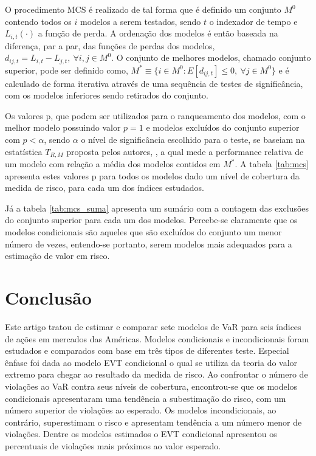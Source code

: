 \documentclass[1p]{elsarticle}
\theoremstyle{definition}
\begin{document}
O procedimento MCS é realizado de tal forma que é definido um conjunto $M^0$ contendo todos os $i$ modelos a serem testados, sendo $t$ o indexador de tempo e $L_{i, t}(\cdot)$ a função de perda. A ordenação dos modelos é então baseada na diferença, par a par, das funções de perdas dos modelos, $d_{ij, t} = L_{i, t}-L_{j, t}, \ \forall i,j \in M^0$. O conjunto de melhores modelos, chamado conjunto superior, pode ser definido como, $M^\ast \equiv \{i \in M^0 : E[d_{ij,t}] \leq 0, \ \forall j \in M^0\}$ e é calculado de forma iterativa através de uma sequência de testes de significância, com os modelos inferiores sendo retirados do conjunto.

Os valores p, que podem ser utilizados para o ranqueamento dos modelos, com o melhor modelo possuindo valor $p=1$ e modelos excluídos do conjunto superior com $p<\alpha$, sendo $\alpha$ o nível de significância escolhido para o teste, se baseiam na estatística $T_{R, M}$ proposta pelos autores, \cite{Hansen2011}, a qual mede a performance relativa de um modelo com relação a média dos modelos contidos em $M^\ast$. A tabela \ref{tab:mcs} apresenta estes valores p para todos os modelos dado um nível de cobertura da medida de risco, para cada um dos índices estudados.





Já a tabela \ref{tab:mcs_suma} apresenta um sumário com a contagem das exclusões do conjunto superior para cada um dos modelos. Percebe-se claramente que os modelos condicionais são aqueles que são excluídos do conjunto um menor número de vezes, entendo-se portanto, serem modelos mais adequados para a estimação de valor em risco.

\section{Conclusão}

Este artigo tratou de estimar e comparar sete modelos de VaR para seis índices de ações em mercados das Américas. Modelos condicionais e incondicionais foram estudados e comparados com base em três tipos de diferentes teste. Especial ênfase foi dada ao modelo EVT condicional o qual se utiliza da teoria do valor extremo para chegar ao resultado da medida de risco. Ao confrontar o número de violações ao VaR contra seus níveis de cobertura, encontrou-se que os modelos condicionais apresentaram uma tendência a subestimação do risco, com um número superior de violações ao esperado. Os modelos incondicionais, ao contrário, superestimam o risco e apresentam tendência a um número menor de violações. Dentre os modelos estimados o EVT condicional apresentou os percentuais de violações mais próximos ao valor esperado.
\end{document}
